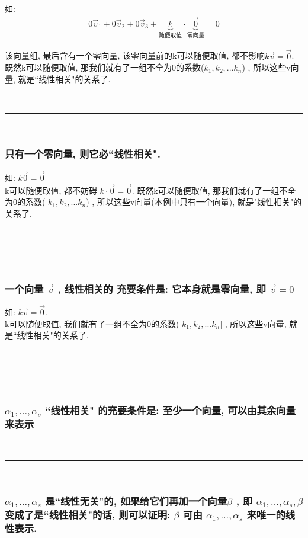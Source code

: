 \documentclass[UTF8]{ctexart}
\begin{document}
如:
\begin{align*}
	0\vec{v}_1+0\vec{v}_2+0\vec{v}_3+\underset{\text{随便取值}}{\underbrace{k}}\cdot \underset{\text{零向量}}{\underbrace{\vec{0}}}=0
\end{align*}

该向量组, 最后含有一个零向量, 该零向量前的k可以随便取值, 都不影响$k\vec{v}=\vec{0}$. 既然k可以随便取值, 那我们就有了一组不全为0的系数($k_1, k_2, ...k_n$) , 所以这些v向量, 就是``线性相关"的关系了. 

~\\
\hrule
~\\

\subsubsection{只有一个零向量, 则它必``线性相关".}

如:  $k\vec{0}=\vec{0}$ \\
k可以随便取值, 都不妨碍  $ k \cdot \vec{0}= \vec{0}$. 既然k可以随便取值, 那我们就有了一组不全为0的系数( $ k_1, k_2, ...k_n$) , 所以这些v向量(本例中只有一个向量), 就是"线性相关"的关系了.

~\\
\hrule
~\\



\subsubsection{一个向量 $\vec{v}$ , 线性相关的 充要条件是: 它本身就是零向量, 即 $\vec{v}=0$}

如: $k\vec{v}=\vec{0}$.  \\
k可以随便取值, 我们就有了一组不全为0的系数( $k_1, k_2, ...k_n]$ , 所以这些v向量, 就是``线性相关"的关系了. 

~\\
\hrule
~\\

\subsubsection{$	\alpha _1,...,\alpha _s$ ``线性相关" 的充要条件是: 至少一个向量, 可以由其余向量来表示}

~\\
\hrule
~\\

\subsubsection{$\alpha _1,...,\alpha _s$ 是``线性无关"的, 如果给它们再加一个向量$\beta$ , 即 $	\alpha _1,...,\alpha _s, \beta$ 变成了是``线性相关"的话, 则可以证明: $\beta$ 可由 $	\alpha _1,...,\alpha _s$ 来唯一的线性表示. }
\end{document}
